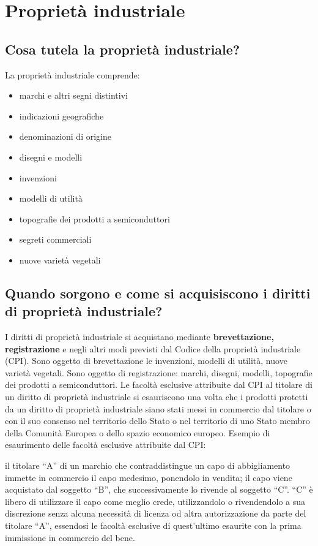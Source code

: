 \newpage
\section{Proprietà industriale}

\subsection{Cosa tutela la proprietà industriale?}
La proprietà industriale comprende:
\begin{itemize}
    \item marchi e altri segni distintivi
    \item indicazioni geografiche
    \item denominazioni di origine
    \item disegni e modelli
    \item invenzioni
    \item modelli di utilità
    \item topografie dei prodotti a semiconduttori
    \item segreti commerciali
    \item nuove varietà vegetali
\end{itemize}

\subsection{Quando sorgono e come si acquisiscono i diritti di proprietà industriale?}
I diritti di proprietà industriale si acquistano mediante \textbf{brevettazione, registrazione} e negli altri
modi previsti dal Codice della proprietà industriale (CPI). \newline
Sono oggetto di brevettazione le invenzioni, modelli di utilità, nuove varietà vegetali. \newline
Sono oggetto di registrazione: marchi, disegni, modelli, topografie dei prodotti a semiconduttori.\newline
Le facoltà esclusive attribuite dal CPI al titolare di un diritto di proprietà industriale si esauriscono una volta
che i prodotti protetti da un diritto di proprietà industriale siano stati messi in commercio dal titolare o con
il suo consenso nel territorio dello Stato o nel territorio di uno Stato membro della Comunità Europea o dello spazio
economico europeo. Esempio di esaurimento delle facoltà esclusive attribuite dal CPI: \newline

il titolare “A” di un marchio che contraddistingue un capo di abbigliamento immette in commercio il capo medesimo, ponendolo in vendita; il capo viene acquistato dal soggetto “B”, che successivamente lo rivende al soggetto “C”. “C” è libero di utilizzare il capo come meglio crede, utilizzandolo o rivendendolo a sua discrezione senza alcuna necessità di licenza od altra autorizzazione da parte del titolare “A”, essendosi le facoltà esclusive di quest’ultimo esaurite con la prima immissione in commercio del bene.

